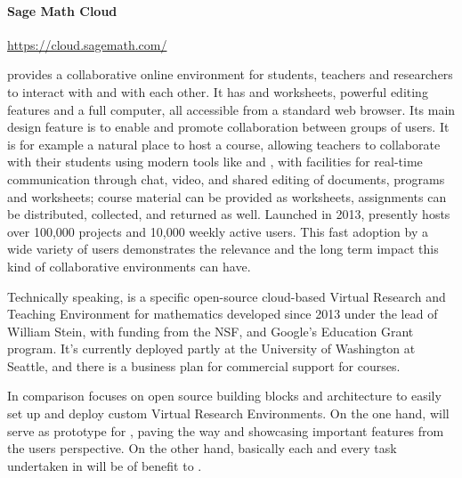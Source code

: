 \paragraph{Sage Math Cloud} \url{https://cloud.sagemath.com/} \label{sec:SMC-page}

\SMC provides a collaborative online environment for students,
teachers and researchers to interact with \Sage and with each
other. It has \Sage and \IPython worksheets, powerful \LATEX editing
features and a full \Linux computer, all accessible from a standard
web browser. Its main design feature is to enable and promote
collaboration between groups of users. It is for example a natural
place to host a course, allowing teachers to collaborate with their
students using modern tools like \Sage and \LATEX, with facilities for
real-time communication through chat, video, and shared editing of
documents, programs and worksheets; course material can be provided as
worksheets, assignments can be distributed, collected, and returned as
well. Launched in 2013, \SMC presently hosts over 100,000 projects and
10,000 weekly active users. This fast adoption by a wide variety of
users demonstrates the relevance and the long term impact this kind of
collaborative environments can have.

Technically speaking, \SMC is a specific open-source cloud-based
Virtual Research and Teaching Environment for mathematics developed
since 2013 under the lead of William Stein, with funding from the NSF,
and Google's Education Grant program.
It's currently deployed partly at the University of Washington at
Seattle, and there is a business plan for commercial support for
courses.



In comparison \TheProject focuses on open source building blocks and
architecture to easily set up and deploy custom Virtual Research
Environments. On the one hand, \SMC will serve as prototype for
\TheProject, paving the way and showcasing important features from the
users perspective. On the other hand, basically each and every task
undertaken in \TheProject will be of benefit to \SMC.


